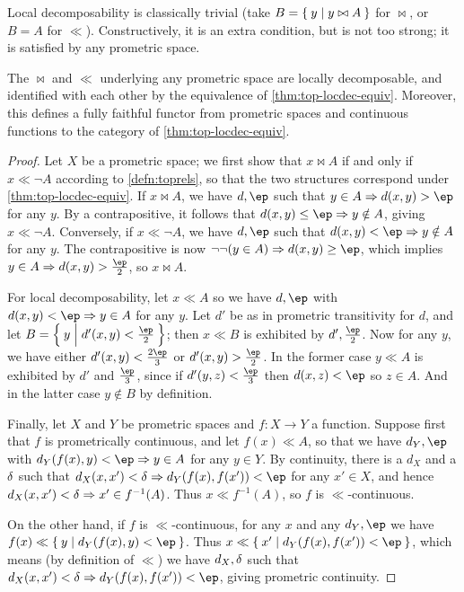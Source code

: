 \documentclass{article}
\def\cpl#1{\neg #1}
\let\implies\Rightarrow
\def\inv{^{-1}}
\def\hfep{\frac{\ep}{2}}
\begin{document}
Local decomposability is classically trivial (take $B=\Set{y|y\bowtie A}$ for $\bowtie$, or $B=A$ for $\ll$).
Constructively, it is an extra condition, but is not too strong; it is satisfied by any prometric space.

\begin{thm}\label{thm:promet-top}
  The $\bowtie$ and $\ll$ underlying any prometric space are locally decomposable, and identified with each other by the equivalence of \cref{thm:top-locdec-equiv}.
  Moreover, this defines a fully faithful functor from prometric spaces and continuous functions to the category of \cref{thm:top-locdec-equiv}.
\end{thm}
\begin{proof}
  Let $X$ be a prometric space; we first show that $x\bowtie A$ if and only if $x\ll \cpl{A}$ according to \cref{defn:toprels}, so that the two structures correspond under \cref{thm:top-locdec-equiv}.
  If $x\bowtie A$, we have $d,\ep$ such that $y\in A \implies d(x,y)>\ep$ for any $y$.
  By a contrapositive, it follows that $d(x,y)\le \ep \implies y\notin A$, giving $x\ll \cpl{A}$.
  Conversely, if $x\ll\cpl{A}$, we have $d,\ep$ such that $d(x,y)< \ep \implies y\notin A$ for any $y$.
  The contrapositive is now $\neg\neg(y\in A) \implies d(x,y)\ge \ep$, which implies $y\in A \implies d(x,y)> \hfep$, so $x\bowtie A$.

  For local decomposability, let $x\ll A$ so we have $d,\ep$ with $d(x,y)< \ep \implies y\in A$ for any $y$.
  Let $d'$ be as in prometric transitivity for $d$, and let $B = \setof{y|d'(x,y)<\hfep}$; then $x\ll B$ is exhibited by $d',\hfep$.
  Now for any $y$, we have either $d'(x,y)<\frac{2\ep}{3}$ or $d'(x,y)>\hfep$.
  In the former case $y\ll A$ is exhibited by $d'$ and $\frac{\ep}{3}$, since if $d'(y,z)<\frac{\ep}{3}$ then $d(x,z)<\ep$ so $z\in A$.
  And in the latter case $y\notin B$ by definition.

  Finally, let $X$ and $Y$ be prometric spaces and $f:X\to Y$ a function.
  Suppose first that $f$ is prometrically continuous, and let $f(x)\ll A$, so that we have $d_Y,\ep$ with $d_Y(f(x),y)< \ep \implies y\in A$ for any $y\in Y$.
  By continuity, there is a $d_X$ and a $\delta$ such that $d_X(x,x')<\de \implies d_Y(f(x),f(x'))<\ep$ for any $x'\in X$, and hence $d_X(x,x')<\de \implies x'\in f\inv(A)$.
  Thus $x\ll f\inv(A)$, so $f$ is $\ll$-continuous.

  On the other hand, if $f$ is $\ll$-continuous, for any $x$ and any $d_Y,\ep$ we have $f(x)\ll \setof{y|d_Y(f(x),y)<\ep}$.
  Thus $x\ll \setof{x'|d_Y(f(x),f(x'))<\ep}$, which means (by definition of $\ll$) we have $d_X,\delta$ such that $d_X(x,x')<\de \implies d_Y(f(x),f(x'))<\ep$, giving prometric continuity.
\end{proof}
\end{document}
